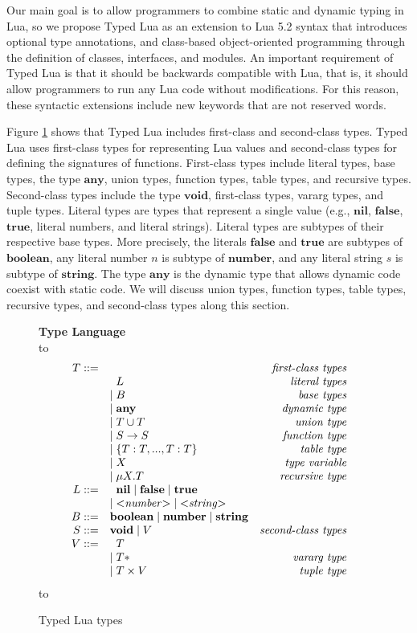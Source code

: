 \documentclass[preprint]{sig-alternate}
\newcommand{\Any}{\mathbf{any}}
\newcommand{\Nil}{\mathbf{nil}}
\newcommand{\False}{\mathbf{false}}
\newcommand{\True}{\mathbf{true}}
\newcommand{\Boolean}{\mathbf{boolean}}
\newcommand{\Number}{\mathbf{number}}
\newcommand{\String}{\mathbf{string}}
\newcommand{\Void}{\mathbf{void}}
\def\dstart{\hbox to \hsize{\vrule depth 4pt\hrulefill\vrule depth 4pt}}
\def\dend{\hbox to \hsize{\vrule height 4pt\hrulefill\vrule height 4pt}}
\begin{document}
Our main goal is to allow programmers to combine static and dynamic
typing in Lua, so we propose Typed Lua as an extension to Lua 5.2
syntax that introduces optional type annotations, and class-based
object-oriented programming through the definition of classes,
interfaces, and modules.
An important requirement of Typed Lua is that it should be backwards
compatible with Lua, that is, it should allow programmers to run any
Lua code without modifications.
For this reason, these syntactic extensions include new keywords
that are not reserved words.

Figure \ref{fig:typelang} shows that Typed Lua includes first-class
and second-class types.
Typed Lua uses first-class types for representing Lua values and
second-class types for defining the signatures of functions.
First-class types include literal types, base types, the type $\Any$,
union types, function types, table types, and recursive types.
Second-class types include the type $\Void$, first-class types,
vararg types, and tuple types.
Literal types are types that represent a single value
(e.g., $\Nil$, $\False$, $\True$, literal numbers, and
literal strings).
Literal types are subtypes of their respective base types.
More precisely, the literals $\False$ and $\True$ are subtypes of
$\Boolean$, any literal number $n$ is subtype of $\Number$, and any
literal string $s$ is subtype of $\String$.
The type $\Any$ is the dynamic type that allows dynamic code coexist
with static code.
We will discuss union types, function types, table types, recursive
types, and second-class types along this section.

\begin{figure}[!ht]
\textbf{Type Language}\\
\dstart
$$
\begin{array}{rlr}
T ::= & & \textit{first-class types}\\
& \;\; L & \textit{literal types}\\
& | \; B & \textit{base types}\\
& | \; \Any & \textit{dynamic type}\\
& | \; T \cup T & \textit{union type}\\
& | \; S \rightarrow S & \textit{function type}\\
& | \; \{T:T, ..., T:T\} & \textit{table type}\\
& | \; X & \textit{type variable}\\
& | \; \mu X.T & \textit{recursive type}\\
L ::= & \;\; \Nil \; | \; \False \; | \; \True \\
& | \; {<}{\it number}{>} \; | \; {<}{\it string}{>} & \\
B ::= & \Boolean \; | \; \Number \; | \; \String & \\
S ::= & \Void \; | \; V & \textit{second-class types}\\
V ::= & \;\; T & \\
& | \; T* & \textit{vararg type}\\
& | \; T \times V & \textit{tuple type}
\end{array}
$$
\dend
\caption{Typed Lua types}
\label{fig:typelang}
\end{figure}
\end{document}
